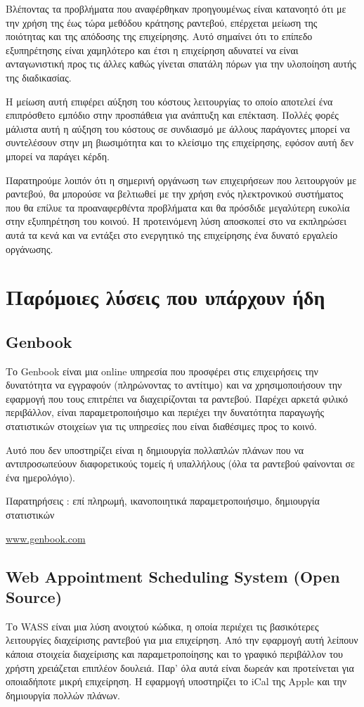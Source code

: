 Βλέποντας τα προβλήματα που αναφέρθηκαν προηγουμένως είναι κατανοητό ότι με την χρήση της έως τώρα μεθόδου κράτησης ραντεβού, επέρχεται μείωση της ποιότητας και της απόδοσης της επιχείρησης. Αυτό σημαίνει ότι το επίπεδο εξυπηρέτησης είναι χαμηλότερο και έτσι η επιχείρηση αδυνατεί να είναι ανταγωνιστική προς τις άλλες καθώς γίνεται σπατάλη πόρων για την υλοποίηση αυτής της διαδικασίας.

Η μείωση αυτή επιφέρει αύξηση του κόστους λειτουργίας το οποίο αποτελεί ένα επιπρόσθετο εμπόδιο στην προσπάθεια για ανάπτυξη και επέκταση. Πολλές φορές μάλιστα αυτή η αύξηση του κόστους σε συνδιασμό με άλλους παράγοντες μπορεί να συντελέσουν στην μη βιωσιμότητα και το κλείσιμο της επιχείρησης, εφόσον αυτή δεν μπορεί να παράγει κέρδη.

Παρατηρούμε λοιπόν ότι η σημερινή οργάνωση των επιχειρήσεων που λειτουργούν με ραντεβού, θα μπορούσε να βελτιωθεί με την χρήση ενός ηλεκτρονικού συστήματος που θα επίλυε τα προαναφερθέντα προβλήματα και θα πρόσδιδε μεγαλύτερη ευκολία στην εξυπηρέτηση του κοινού. Η προτεινόμενη λύση αποσκοπεί στο να εκπληρώσει αυτά τα κενά και να εντάξει στο ενεργητικό της επιχείρησης ένα δυνατό εργαλείο οργάνωσης.

\section{Παρόμοιες λύσεις που υπάρχουν ήδη}
\subsection{Genbook}
Το Genbook είναι μια online υπηρεσία που προσφέρει στις επιχειρήσεις την δυνατότητα να εγγραφούν (πληρώνοντας το αντίτιμο) και να χρησιμοποιήσουν την εφαρμογή που τους επιτρέπει να διαχειρίζονται τα ραντεβού. Παρέχει αρκετά φιλικό περιβάλλον, είναι παραμετροποιήσιμο και περιέχει την δυνατότητα παραγωγής στατιστικών στοιχείων για τις υπηρεσίες που είναι διαθέσιμες προς το κοινό. 

Αυτό που δεν υποστηρίζει είναι η δημιουργία πολλαπλών πλάνων που να αντιπροσωπεύουν διαφορετικούς τομείς ή υπαλλήλους (όλα τα ραντεβού φαίνονται σε ένα ημερολόγιο).

Παρατηρήσεις : επί πληρωμή, ικανοποιητικά παραμετροποιήσιμο, δημιουργία στατιστικών

\href{http://www.genbook.com}{www.genbook.com}

\subsection{Web Appointment Scheduling System (Open Source)}
Το WASS είναι μια λύση ανοιχτού κώδικα, η οποία περιέχει τις βασικότερες λειτουργίες διαχείρισης ραντεβού για μια επιχείρηση. Από την εφαρμογή αυτή λείπουν κάποια στοιχεία διαχείρισης και παραμετροποίησης και το γραφικό περιβάλλον του χρήστη χρειάζεται επιπλέον δουλειά. Παρ' όλα αυτά είναι δωρεάν και προτείνεται για οποιαδήποτε μικρή επιχείρηση. Η εφαρμογή υποστηρίζει το iCal της Apple και την δημιουργία πολλών πλάνων.

